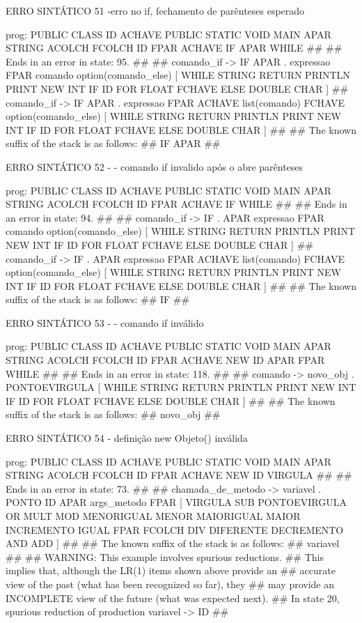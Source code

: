 \documentclass[12pt,a4paper,twoside]{report}
\begin{document}
\begin{terminal}
{ERRO SINTÁTICO 51 -erro no if, fechamento de parênteses esperado

prog: PUBLIC CLASS ID ACHAVE PUBLIC STATIC VOID MAIN APAR STRING ACOLCH FCOLCH ID FPAR ACHAVE IF APAR WHILE 
##
## Ends in an error in state: 95.
##
## comando_if -> IF APAR . expressao FPAR comando option(comando_else) [ WHILE STRING RETURN PRINTLN PRINT NEW INT IF ID FOR FLOAT FCHAVE ELSE DOUBLE CHAR ]
## comando_if -> IF APAR . expressao FPAR ACHAVE list(comando) FCHAVE option(comando_else) [ WHILE STRING RETURN PRINTLN PRINT NEW INT IF ID FOR FLOAT FCHAVE ELSE DOUBLE CHAR ]
##
## The known suffix of the stack is as follows:
## IF APAR 
##

ERRO SINTÁTICO 52 - -  comando if invalido após o abre parênteses

prog: PUBLIC CLASS ID ACHAVE PUBLIC STATIC VOID MAIN APAR STRING ACOLCH FCOLCH ID FPAR ACHAVE IF WHILE 
##
## Ends in an error in state: 94.
##
## comando_if -> IF . APAR expressao FPAR comando option(comando_else) [ WHILE STRING RETURN PRINTLN PRINT NEW INT IF ID FOR FLOAT FCHAVE ELSE DOUBLE CHAR ]
## comando_if -> IF . APAR expressao FPAR ACHAVE list(comando) FCHAVE option(comando_else) [ WHILE STRING RETURN PRINTLN PRINT NEW INT IF ID FOR FLOAT FCHAVE ELSE DOUBLE CHAR ]
##
## The known suffix of the stack is as follows:
## IF 
##

ERRO SINTÁTICO 53 - -  comando if  inválido

prog: PUBLIC CLASS ID ACHAVE PUBLIC STATIC VOID MAIN APAR STRING ACOLCH FCOLCH ID FPAR ACHAVE NEW ID APAR FPAR WHILE 
##
## Ends in an error in state: 118.
##
## comando -> novo_obj . PONTOEVIRGULA [ WHILE STRING RETURN PRINTLN PRINT NEW INT IF ID FOR FLOAT FCHAVE ELSE DOUBLE CHAR ]
##
## The known suffix of the stack is as follows:
## novo_obj 
##

ERRO SINTÁTICO 54 - definição new Objeto() inválida

prog: PUBLIC CLASS ID ACHAVE PUBLIC STATIC VOID MAIN APAR STRING ACOLCH FCOLCH ID FPAR ACHAVE NEW ID VIRGULA 
##
## Ends in an error in state: 73.
##
## chamada_de_metodo -> variavel . PONTO ID APAR args_metodo FPAR [ VIRGULA SUB PONTOEVIRGULA OR MULT MOD MENORIGUAL MENOR MAIORIGUAL MAIOR INCREMENTO IGUAL FPAR FCOLCH DIV DIFERENTE DECREMENTO AND ADD ]
##
## The known suffix of the stack is as follows:
## variavel 
##
## WARNING: This example involves spurious reductions.
## This implies that, although the LR(1) items shown above provide an
## accurate view of the past (what has been recognized so far), they
## may provide an INCOMPLETE view of the future (what was expected next).
## In state 20, spurious reduction of production variavel -> ID 
##

}
\end{terminal}
\end{document}
